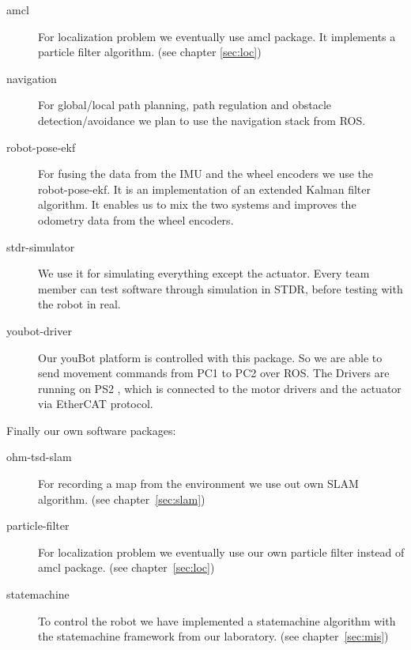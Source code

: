 \begin{description}
	\item [amcl] For localization problem we eventually use amcl package. It implements a particle filter algorithm. (see chapter \ref{sec:loc})
	\item [navigation] For global/local path planning, path regulation and obstacle detection/avoidance we plan to use the navigation stack from ROS.
	\item [robot-pose-ekf] For fusing the data from the IMU and the wheel encoders we use the robot-pose-ekf. It is an implementation of an extended Kalman filter algorithm. It enables us to mix the two systems and improves the odometry data from the wheel encoders.
	\item [stdr-simulator] We use it for simulating everything except the actuator. Every team member can test software through simulation in STDR, before testing with the robot in real.
	\item [youbot-driver] Our youBot platform is controlled with this package. So we are able to send movement commands from PC1 to PC2 over ROS. The Drivers are running on PS2 , which is connected to the motor drivers and the actuator via EtherCAT protocol.
\end{description}

\noindent Finally our own software packages:

\begin{description}
	\item [ohm-tsd-slam] For recording a map from the environment we use out own SLAM algorithm. (see chapter~\ref{sec:slam})
	\item [particle-filter] For localization problem we eventually use our own particle filter instead of amcl package. (see chapter~\ref{sec:loc})
	\item [statemachine] To control the robot we have implemented a statemachine algorithm with the statemachine framework from our laboratory. (see chapter~\ref{sec:mis})
\end{description}

